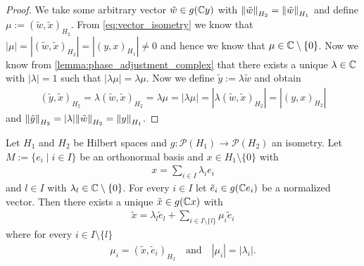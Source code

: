 \begin{proof}
	We take some arbitrary vector $\tilde{w} \in g(\C y)$ with $\norm[H_2]{\tilde{w}} = \norm[H_1]{\tilde{w}}$ and define $\mu := (\tilde{w}, \tilde{x})_{H_2}$. From \eqref{eq:vector_isometry} we know that $|\mu| = |(\tilde{w},\tilde{x})_{H_2}| = |(y,x)_{H_1}| \neq 0$ and hence we know that $\mu \in \C \setminus \{0\}$. Now we know from \ref{lemma:phase_adjustment_complex} that there exists a unique $\lambda \in \C$ with $|\lambda| = 1$ such that $|\lambda \mu| = \lambda \mu$. Now we define $\tilde{y} := \lambda \tilde{w}$ and obtain
	\begin{align*}
		(\tilde{y}, \tilde{x})_{H_2} = \lambda (\tilde{w}, \tilde{x})_{H_2} = \lambda \mu = |\lambda \mu| = |\lambda (\tilde{w}, \tilde{x})_{H_2}| = |(y,x)_{H_2}|
	\end{align*}
	and $\norm[H_2]{\tilde{y}} = |\lambda| \norm[H_2]{\tilde{w}} = \norm[H_1]{y}$. 
\end{proof}


\begin{lemma} \label{lemma:aux_main}
	Let $H_1$ and $H_2$ be Hilbert spaces and $g: \mathcal{P}(H_1) \to \mathcal{P}(H_2)$ an isometry. Let $M := \{e_i \mid i \in I\}$ be an orthonormal basis and $x \in H_1 \setminus \{0\}$ with
	\begin{align*}
		x = \sum_{i \in I} \lambda_i e_i
	\end{align*} 
	and $l \in I$ with $\lambda_l \in \C \setminus \{0\}$. For every $i \in I$ let $\tilde{e}_i \in g(\C e_i)$ be a normalized vector. Then there exists a unique $\tilde{x} \in g(\C x)$ with 
	\begin{align*}
		\tilde{x} = \lambda_l \tilde{e}_l + \sum_{i \in I \setminus \{l\}} \mu_i \tilde{e}_i
	\end{align*}
	where for every $i \in I \setminus \{l\}$
	\begin{align*}
		\mu_i = (\tilde{x}, \tilde{e}_i)_{H_2} \quad \text{and} \quad |\mu_i| = |\lambda_i|.
	\end{align*}
\end{lemma}

